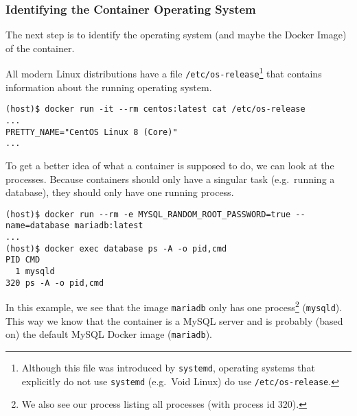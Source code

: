 \subsubsection{Identifying the Container Operating System}\label{subsubsection:idenitfy-container-os}
The next step is to identify the operating system (and maybe the Docker Image) of the container.

All modern Linux distributions have a file \lstinline{/etc/os-release}\footnote{Although this file was introduced by \lstinline{systemd}, operating systems that explicitly do not use \lstinline{systemd} (e.g.\ Void Linux) do use \lstinline{/etc/os-release}.} that contains information about the running operating system.
\begin{lstlisting}[caption={CentOS container \lstinline{/etc/os-release}.},captionpos=b]
(host)$ docker run -it --rm centos:latest cat /etc/os-release
...
PRETTY_NAME="CentOS Linux 8 (Core)"
...
\end{lstlisting}

To get a better idea of what a container is supposed to do, we can look at the processes. Because containers should only have a singular task (e.g.\ running a database), they should only have one running process.

\begin{lstlisting}[caption={A container only has one process.},captionpos=b]
(host)$ docker run --rm -e MYSQL_RANDOM_ROOT_PASSWORD=true --name=database mariadb:latest
...
(host)$ docker exec database ps -A -o pid,cmd
PID CMD
  1 mysqld
320 ps -A -o pid,cmd
\end{lstlisting}

In this example, we see that the image \lstinline{mariadb} only has one process\footnote{We also see our process listing all processes (with process id 320).} (\lstinline{mysqld}). This way we know that the container is a MySQL server and is probably (based on) the default MySQL Docker image (\lstinline{mariadb}).
